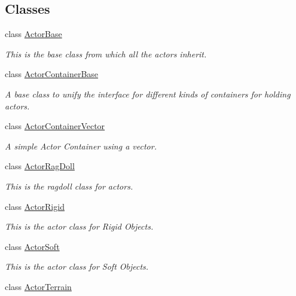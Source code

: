 \subsection*{Classes}
\begin{DoxyCompactItemize}
\item 
class \hyperlink{classphys_1_1ActorBase}{ActorBase}
\begin{DoxyCompactList}\small\item\em This is the base class from which all the actors inherit. \item\end{DoxyCompactList}\item 
class \hyperlink{classphys_1_1ActorContainerBase}{ActorContainerBase}
\begin{DoxyCompactList}\small\item\em A base class to unify the interface for different kinds of containers for holding actors. \item\end{DoxyCompactList}\item 
class \hyperlink{classphys_1_1ActorContainerVector}{ActorContainerVector}
\begin{DoxyCompactList}\small\item\em A simple Actor Container using a vector. \item\end{DoxyCompactList}\item 
class \hyperlink{classphys_1_1ActorRagDoll}{ActorRagDoll}
\begin{DoxyCompactList}\small\item\em This is the ragdoll class for actors. \item\end{DoxyCompactList}\item 
class \hyperlink{classphys_1_1ActorRigid}{ActorRigid}
\begin{DoxyCompactList}\small\item\em This is the actor class for Rigid Objects. \item\end{DoxyCompactList}\item 
class \hyperlink{classphys_1_1ActorSoft}{ActorSoft}
\begin{DoxyCompactList}\small\item\em This is the actor class for Soft Objects. \item\end{DoxyCompactList}\item 
class \hyperlink{classphys_1_1ActorTerrain}{ActorTerrain}

\end{DoxyCompactItemize}
